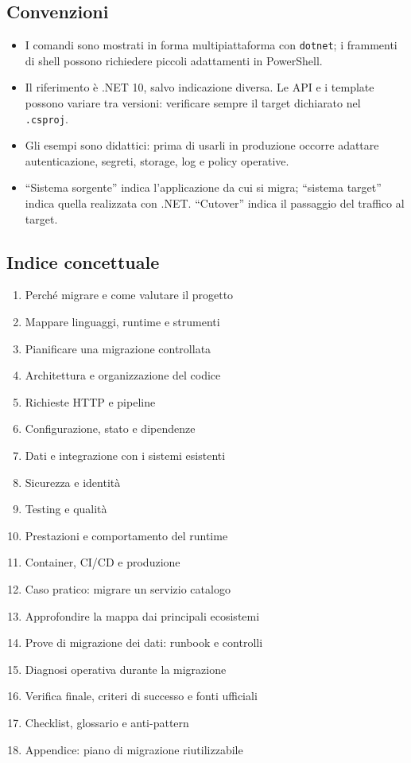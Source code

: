 \documentclass[
  italian,
  10pt,
]{book}
\providecommand{\tightlist}{%
  \setlength{\itemsep}{0pt}\setlength{\parskip}{0pt}}
\begin{document}
\subsection{Convenzioni}\label{convenzioni-2}

\begin{itemize}
\tightlist
\item
  I comandi sono mostrati in forma multipiattaforma con \texttt{dotnet};
  i frammenti di shell possono richiedere piccoli adattamenti in
  PowerShell.
\item
  Il riferimento è .NET 10, salvo indicazione diversa. Le API e i
  template possono variare tra versioni: verificare sempre il target
  dichiarato nel \texttt{.csproj}.
\item
  Gli esempi sono didattici: prima di usarli in produzione occorre
  adattare autenticazione, segreti, storage, log e policy operative.
\item
  ``Sistema sorgente'' indica l'applicazione da cui si migra; ``sistema
  target'' indica quella realizzata con .NET. ``Cutover'' indica il
  passaggio del traffico al target.
\end{itemize}

\subsection{Indice concettuale}\label{indice-concettuale}

\begin{enumerate}
\def\labelenumi{\arabic{enumi}.}
\tightlist
\item
  Perché migrare e come valutare il progetto
\item
  Mappare linguaggi, runtime e strumenti
\item
  Pianificare una migrazione controllata
\item
  Architettura e organizzazione del codice
\item
  Richieste HTTP e pipeline
\item
  Configurazione, stato e dipendenze
\item
  Dati e integrazione con i sistemi esistenti
\item
  Sicurezza e identità
\item
  Testing e qualità
\item
  Prestazioni e comportamento del runtime
\item
  Container, CI/CD e produzione
\item
  Caso pratico: migrare un servizio catalogo
\item
  Approfondire la mappa dai principali ecosistemi
\item
  Prove di migrazione dei dati: runbook e controlli
\item
  Diagnosi operativa durante la migrazione
\item
  Verifica finale, criteri di successo e fonti ufficiali
\item
  Checklist, glossario e anti-pattern
\item
  Appendice: piano di migrazione riutilizzabile
\end{enumerate}
\end{document}
